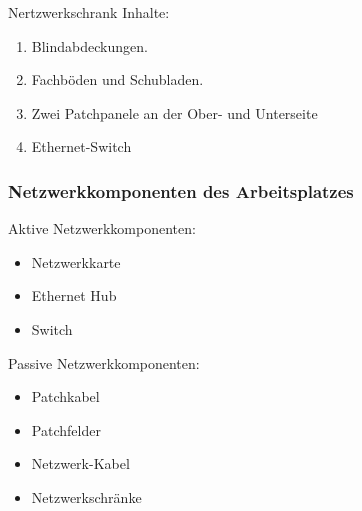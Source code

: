 Nertzwerkschrank Inhalte:
\begin{enumerate}[noitemsep]
\item Blindabdeckungen.
\item Fachböden und Schubladen.
\item Zwei Patchpanele an der Ober- und Unterseite 
\item Ethernet-Switch
\end{enumerate}

\subsubsection{Netzwerkkomponenten des Arbeitsplatzes}\label{Netzwerkomponenten}

Aktive Netzwerkkomponenten:
\begin{itemize}[noitemsep]
\item Netzwerkkarte
\item Ethernet Hub
\item Switch
\end{itemize}

Passive Netzwerkkomponenten:
\begin{itemize}[noitemsep]
\item Patchkabel
\item Patchfelder
\item Netzwerk-Kabel
\item Netzwerkschränke
\end{itemize}


